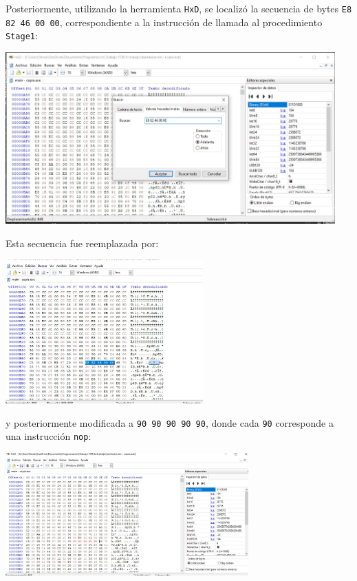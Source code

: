 \documentclass[11pt,a4paper]{article}
\begin{document}
\noindent Posteriormente, utilizando la herramienta \texttt{HxD}, se localizó la secuencia de bytes \texttt{E8 82 46 00 00}, correspondiente a la instrucción de llamada al procedimiento \texttt{Stage1}:
\vspace{1ex}
\begin{center}
\includegraphics[width=0.95\textwidth]{4-4.png}
\end{center}
\vspace{2ex}

\noindent Esta secuencia fue reemplazada por:
\begin{center}
\includegraphics[width=0.57\textwidth]{4-5.png}
\end{center}
\vspace{1ex}

\noindent y posteriormente modificada a \texttt{90 90 90 90 90}, donde cada \texttt{90} corresponde a una instrucción \texttt{nop}:
\vspace{1ex}
\begin{center}
\includegraphics[width=0.7\textwidth]{4-6.png}
\end{center}
\vspace{2ex}
\end{document}
